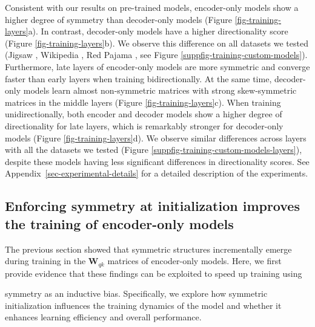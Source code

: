 Consistent with our results on pre-trained models, encoder-only models show a higher degree of symmetry than decoder-only models (Figure \ref{fig-training-layers}a). 
%
In contrast, decoder-only models have a higher directionality score (Figure \ref{fig-training-layers}b).
%
We observe this difference on all datasets we tested (Jigsaw \citep{jigsaw_challenge}, Wikipedia \citep{wikidump}, Red Pajama \citep{together2023redpajama}, see Figure \ref{suppfig-training-custom-models}).
%
Furthermore, late layers of encoder-only models are more symmetric and converge faster than early layers when training bidirectionally. At the same time, decoder-only models learn almost non-symmetric matrices with strong skew-symmetric matrices in the middle layers (Figure \ref{fig-training-layers}c).
% 
When training unidirectionally, both encoder and decoder models show a higher degree of directionality for late layers, which is remarkably stronger for decoder-only models (Figure \ref{fig-training-layers}d).
%
We observe similar differences across layers with all the datasets we tested (Figure \ref{suppfig-training-custom-models-layers}), despite these models having
less significant differences in directionality scores.
%
See Appendix~\ref{sec-experimental-details} for a detailed description of the experiments.
% 

\subsection{Enforcing symmetry at initialization improves the training of encoder-only models}
\label{sec-symmetric-initialization}
%
The previous section showed that symmetric structures incrementally emerge during training in the $\bm{W}_{qk}$ matrices of encoder-only models.
%
Here, we first provide evidence that these findings can be exploited to speed up training using
%



symmetry as an inductive bias. Specifically, we explore how symmetric initialization influences the training dynamics of the model and whether it enhances learning efficiency and overall performance.
%

